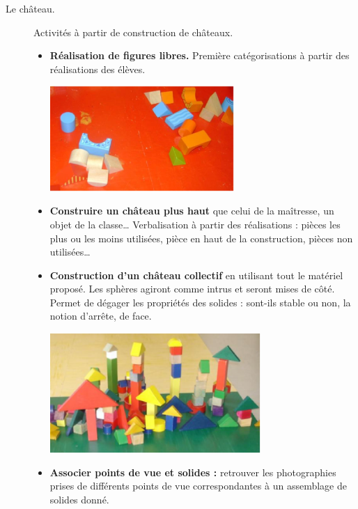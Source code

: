 \begin{exercice*}
\begin{description}
   \item[Le château.] Activités à partir de construction de châteaux.
      \begin{itemize}
         \item {\bf Réalisation de figures libres.} Première catégorisations à partir des réalisations des élèves.
         \begin{center}
            \includegraphics[width=7cm]{Geometrie_did/Images/Geo6_activites_chateau5}
         \end{center}
         \item {\bf Construire un château plus haut} que celui de la maîtresse, un objet de la classe\dots{} Verbalisation à partir des réalisations : pièces les plus ou les moins utilisées, pièce en haut de la construction, pièces non utilisées\dots
         \item {\bf Construction d’un château collectif} en utilisant tout le matériel proposé. Les sphères agiront comme intrus et seront mises de côté. Permet de dégager les propriétés des solides : sont-ils stable ou non, la notion d’arrête, de face.
         \begin{center}
            \includegraphics[width=8cm]{Geometrie_did/Images/Geo6_activites_chateau3}
         \end{center}
         \item {\bf Associer points de vue et solides :} retrouver les photographies prises de différents points de vue correspondantes à un assemblage de solides donné. \\

\end{itemize}
\end{description}
\end{exercice*}
